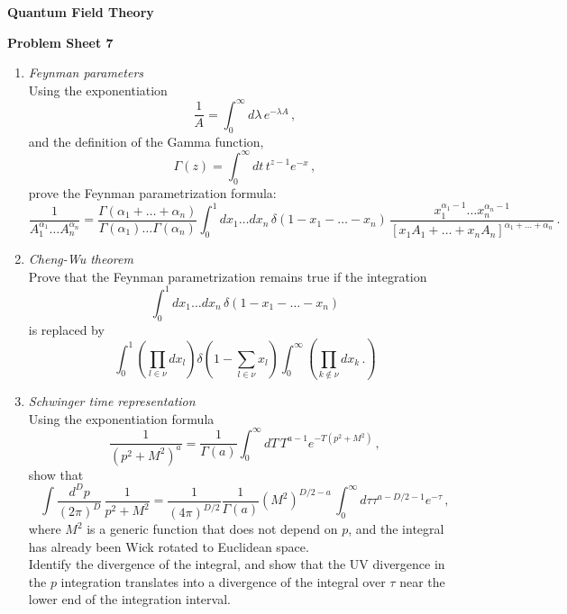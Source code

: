 \documentclass[12pt,a4paper]{article}
\begin{document}
\begin{center}
\textbf{ Quantum Field Theory}\\[\baselineskip]
\end{center}
\textbf{ Problem Sheet 7}

\begin{enumerate}
\item \emph{ Feynman parameters} \\

  Using the exponentiation
  \[
    \frac{1}{A} = \int_0^\infty d\lambda\, e^{-\lambda A}\, ,
  \]
  and the definition of the Gamma function,
  \[
    \Gamma(z) = \int_0^\infty dt\, t^{z-1} e^{-x}\, ,
  \]
  prove the Feynman parametrization formula:
  \[
    \frac{1}{A_1^{\alpha_1} \ldots A_n^{\alpha_n}} =
    \frac{\Gamma(\alpha_1+\ldots+\alpha_n)}{\Gamma(\alpha_1) \ldots
      \Gamma(\alpha_n)} \int_0^1dx_1 \ldots dx_n\,
    \delta(1-x_1-\ldots -x_n)\,
    \frac{x_1^{\alpha_1-1} \ldots x_n^{\alpha_n-1}}{\left[x_1 A_1 +
        \ldots + x_n A_n\right]^{\alpha_1+\ldots +\alpha_n}}\, .
  \]

  \bigskip
  
\item \emph{ Cheng-Wu theorem}\\

  Prove that the Feynman parametrization remains true if the
  integration
  \[
    \int_0^1dx_1 \ldots dx_n\,
    \delta(1-x_1-\ldots -x_n)
  \]
  is replaced by
  \[
    \int_0^1 \left(\prod_{l\in\nu} dx_l\right)
    \delta\left(1-\sum_{l\in\nu}x_l\right)
    \int_0^\infty \left(
      \prod_{k\not\in\nu}dx_k\, .
    \right)
  \]

  \bigskip

\item \emph{ Schwinger time representation}\\

  Using the exponentiation formula
  \[
    \frac{1}{(p^2+M^2)^a} = \frac{1}{\Gamma(a)} \int_0^\infty dT\,
    T^{a-1} e^{-T (p^2+M^2)}\, ,
  \]
  show that
  \[
    \int \frac{d^Dp}{(2\pi)^D}\, \frac{1}{p^2+M^2} =
    \frac{1}{(4\pi)^{D/2}}  \frac{1}{\Gamma(a)} \left(M^2\right)^{D/2-a}\, \int_0^\infty
    d\tau \tau^{a-D/2-1} e^{-\tau}\, ,
  \]
  where $M^2$ is a generic function that does not depend on $p$, and
  the integral has already been Wick rotated to Euclidean space. \\

  Identify the divergence of the integral, and show that the UV
  divergence in the $p$ integration translates into a divergence of
  the integral over $\tau$ near the lower end of the integration
  interval. \\


\end{enumerate}
\end{document}
